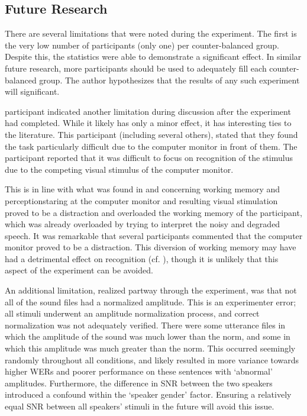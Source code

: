 \subsection{Future Research}\label{chap3:future-research}

There are several limitations that were noted during the experiment.  The first is the very low number of participants (only one) per counter-balanced group.  Despite this, the statistics were able to demonstrate a significant effect.  In similar future research, more participants should be used to adequately fill each counter-balanced group.  The author hypothesizes that the results of any such experiment will \DIFdelbegin {}\DIFdelend \DIFaddbegin {}\DIFaddend significant.  

\DIFdelbegin {}\DIFdelend \DIFaddbegin {}\DIFaddend participant indicated another limitation during discussion after the experiment had completed.  While it likely has only a minor effect, it has interesting ties to the literature.  This participant (including several others), stated that they found the task particularly difficult due to the computer monitor in front of them.  The participant reported that it was difficult to focus on recognition of the stimulus due to the competing visual stimulus of the computer monitor.

This is in line with what was found in \cite{francis:09} and \cite{francis:10} concerning working memory and perception\DIFdelbegin {}\DIFdelend \DIFaddbegin {}\DIFaddend staring at the computer monitor and \DIFaddbegin {}\DIFaddend resulting visual stimulation proved to be a distraction and overloaded the working memory of the participant, which was already overloaded by trying to interpret the noisy and degraded speech.  It was remarkable that several participants commented that the computer monitor proved to be a distraction.  This diversion of working memory may have had a detrimental effect on recognition (cf. \cite{caplan:99}), though it is unlikely that this aspect of the experiment can be avoided.

An additional limitation, realized partway through the experiment, was that not all of the sound files had a normalized amplitude.  This is an experimenter error; all stimuli underwent an amplitude normalization process, and correct normalization was not adequately verified. There were some utterance files in which the amplitude of the sound was much lower than the norm, and some in which this amplitude was much greater than the norm.  This occurred seemingly randomly throughout all conditions, and likely resulted in more variance towards \DIFdelbegin {}\DIFdelend higher WERs and poorer performance on these sentences with `abnormal' amplitudes.  Furthermore, the difference in SNR between the two speakers introduced a confound within the `speaker gender' factor.  Ensuring a relatively equal SNR between all speakers' stimuli in the future will avoid this issue.

